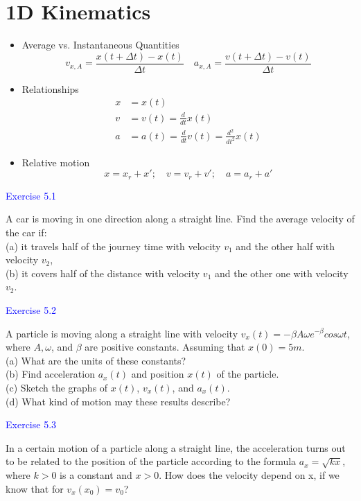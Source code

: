\documentclass{beamer}
\begin{document}
\section{1D Kinematics}
\begin{frame}
  \begin{itemize}
    \item Average vs. Instantaneous Quantities$$v_{x,A} = \frac{x(t+\Delta t)-x(t)}{\Delta t}\quad a_{x,A} = \frac{v(t+\Delta t)-v(t)}{\Delta t}$$
    \item Relationships\begin{align*}
    x &= x(t)\\
    v &= v(t)=\frac{d}{dt} x(t)\\
    a &= a(t)=\frac{d}{dt} v(t)=\frac{d^2}{dt^2}x(t)  
    \end{align*}
    \item Relative motion$$x = x_r + x';\quad v = v_r+v';\quad a=a_r+a'$$
  \end{itemize}
\end{frame}

\begin{frame}
\textcolor{blue}{Exercise 5.1}

A car is moving in one direction along a straight line. Find the average velocity of the car if:\\
(a) it travels half of the journey time with velocity $v_1$ and the other
half with velocity $v_2$,\\
(b) it covers half of the distance with velocity $v_1$ and the other
one with velocity $v_2$.
\end{frame}

\begin{frame}
\textcolor{blue}{Exercise 5.2}

A particle is moving along a straight line with velocity $v_x(t) =
-\beta A\omega e^{-\beta}cos\omega t$, where $A, \omega$, and $\beta$ are positive constants. Assuming
that $x(0) = 5m$.\\
(a) What are the units of these constants?\\
(b) Find acceleration $a_x (t)$ and position $x(t)$ of the particle.\\
(c) Sketch the graphs of $x(t)$, $v_x (t)$, and $a_x (t)$.\\
(d) What kind of motion may these results describe?
\end{frame}

\begin{frame}
\textcolor{blue}{Exercise 5.3}

In a certain motion of a particle along a straight line, the acceleration
turns out to be related to the position of the particle according to the formula $a_x = \sqrt{kx}$, where $k > 0$ is a constant
and $x > 0$. How does the velocity depend on x, if we know that
for $v_x (x_0) = v_0$?
\end{frame}
\end{document}
